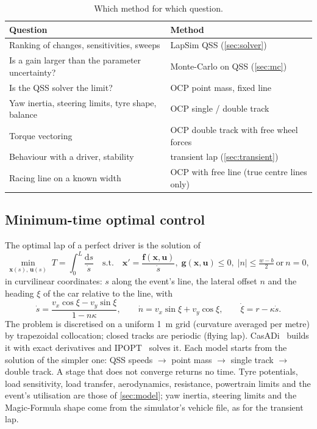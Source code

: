 \documentclass[11pt]{article}
\begin{document}
\begin{table}[t]
\centering\small
\caption{Which method for which question.}\label{tab:methodguide}
\begin{tabularx}{\textwidth}{@{}>{\raggedright\arraybackslash}X>{\raggedright\arraybackslash}p{4.3cm}@{}}
\toprule
Question & Method\\
\midrule
Ranking of changes, sensitivities, sweeps & LapSim QSS (\cref{sec:solver})\\
Is a gain larger than the parameter uncertainty? & Monte-Carlo on QSS (\cref{sec:mc})\\
Is the QSS solver the limit? & OCP point mass, fixed line\\
Yaw inertia, steering limits, tyre shape, balance & OCP single / double track\\
Torque vectoring & OCP double track with free wheel forces\\
Behaviour with a driver, stability & transient lap (\cref{sec:transient})\\
Racing line on a known width & OCP with free line (true centre lines only)\\
\bottomrule
\end{tabularx}
\end{table}

\subsection{Minimum-time optimal control}
The optimal lap of a perfect driver is the solution of~\cite{casanova2000,perantoni2014,lot2014}
\begin{equation}
\min_{\mathbf{x}(s),\,\mathbf{u}(s)} \; T=\int_0^{L}\frac{\mathrm{d}s}{\dot s}
\quad\text{s.t.}\quad \mathbf{x}'=\frac{\mathbf{f}(\mathbf{x},\mathbf{u})}{\dot s},\;
\mathbf{g}(\mathbf{x},\mathbf{u})\le 0,\; |n|\le \tfrac{w-b}{2}\ \text{or}\ n=0,
\label{eq:ocp}
\end{equation}
in curvilinear coordinates: $s$ along the event's line, the lateral offset $n$ and the heading $\xi$ of the car
relative to the line, with
\begin{equation}
\dot s=\frac{v_x\cos\xi-v_y\sin\xi}{1-n\kappa},\qquad \dot n=v_x\sin\xi+v_y\cos\xi,\qquad \dot\xi=r-\kappa\dot s .
\end{equation}
The problem is discretised on a uniform \SI{1}{m} grid (curvature averaged per metre) by trapezoidal collocation;
closed tracks are periodic (flying lap). CasADi~\cite{casadi2019} builds it with exact derivatives and IPOPT~\cite{ipopt2006}
solves it. Each model starts from the solution of the simpler one: QSS speeds $\to$ point mass $\to$ single track
$\to$ double track. A stage that does not converge returns no time. Tyre potentials, load sensitivity, load transfer,
aerodynamics, resistance, powertrain limits and the event's utilisation are those of \cref{sec:model}; yaw inertia,
steering limits and the Magic-Formula shape come from the simulator's vehicle file, as for the transient lap.
\end{document}
